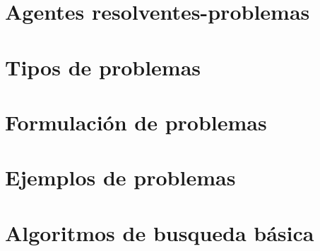 
\section{Agentes resolventes-problemas}%

\section{Tipos de problemas}%

\section{Formulación de problemas}%

\section{Ejemplos de problemas}%

\section{Algoritmos de busqueda básica} %

